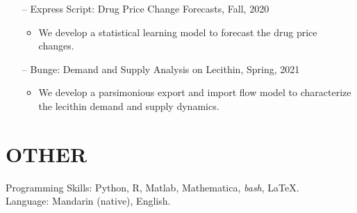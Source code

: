 \documentclass[margin]{res} %
\begin{document}
\begin{resume}
\begin{itemize}
        \item[--]Express Script: Drug Price Change Forecasts, Fall, 2020
            \begin{itemize}
                \item We develop a statistical learning model to forecast the drug price changes.
            \end{itemize}
        \item[--]Bunge: Demand and Supply Analysis on Lecithin, Spring, 2021
            \begin{itemize}
                \item We develop a parsimonious export and import flow model to characterize the lecithin demand and supply dynamics.
            \end{itemize}
    \end{itemize}

\section{OTHER}
    Programming Skills: Python, R, Matlab, Mathematica, {\it bash}, \LaTeX.\\
    Language: Mandarin (native), English.


\end{resume}
\end{document}
